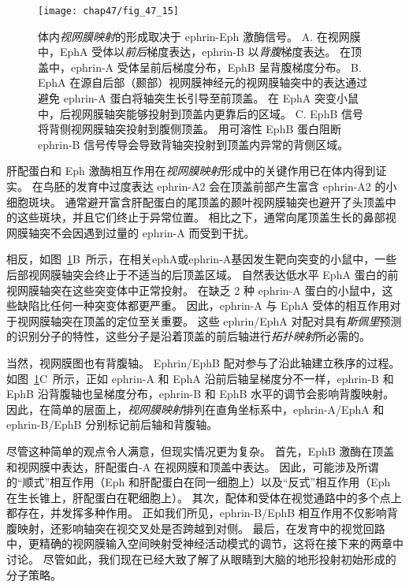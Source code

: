 \begin{figure}[htbp]
	\centering
	\texttt{[image: chap47/fig\_47\_15]}
	\caption{体内\textit{视网膜映射}的形成取决于 ephrin-Eph 激酶信号。
		A. 在视网膜中，EphA 受体以\textit{前后}梯度表达，ephrin-B 以\textit{背腹}梯度表达。
		在顶盖中，ephrin-A 受体呈前后梯度分布，EphB 呈背腹梯度分布。
		B. EphA 在源自后部（颞部）视网膜神经元的视网膜轴突中的表达通过避免 ephrin-A 蛋白将轴突生长引导至前顶盖。
		在 EphA 突变小鼠中，后视网膜轴突能够投射到顶盖内更靠后的区域。
		C. EphB 信号将背侧视网膜轴突投射到腹侧顶盖。
		用可溶性 EphB 蛋白阻断 ephrin-B 信号传导会导致背轴突投射到顶盖内异常的背侧区域。}
	\label{fig:47_15}
\end{figure}


肝配蛋白和 Eph 激酶相互作用在\textit{视网膜映射}形成中的关键作用已在体内得到证实。
在鸟胚的发育中过度表达 ephrin-A2 会在顶盖前部产生富含 ephrin-A2 的小细胞斑块。
通常避开富含肝配蛋白的尾顶盖的颞叶视网膜轴突也避开了头顶盖中的这些斑块，并且它们终止于异常位置。
相比之下，通常向尾顶盖生长的鼻部视网膜轴突不会因遇到过量的 ephrin-A 而受到干扰。


相反，如图~\ref{fig:47_15}B~所示，在相关ephA或ephrin-A基因发生靶向突变的小鼠中，一些后部视网膜轴突会终止于不适当的后顶盖区域。
自然表达低水平 EphA 蛋白的前视网膜轴突在这些突变体中正常投射。
在缺乏 2 种 ephrin-A 蛋白的小鼠中，这些缺陷比任何一种突变体都更严重。
因此，ephrin-A 与 EphA 受体的相互作用对于视网膜轴突在顶盖的定位至关重要。
这些 ephrin/EphA 对配对具有\textit{斯佩里}预测的识别分子的特性，这些分子是沿着顶盖的前后轴进行\textit{拓扑映射}所必需的。


当然，视网膜图也有背腹轴。
Ephrin/EphB 配对参与了沿此轴建立秩序的过程。
如图~\ref{fig:47_15}C~所示，正如 ephrin-A 和 EphA 沿前后轴呈梯度分不一样，ephrin-B 和 EphB 沿背腹轴也呈梯度分布，ephrin-B 和 EphB 水平的调节会影响背腹映射。
因此，在简单的层面上，\textit{视网膜映射}排列在直角坐标系中，ephrin-A/EphA 和 ephrin-B/EphB 分别标记前后轴和背腹轴。


尽管这种简单的观点令人满意，但现实情况更为复杂。
首先，EphB 激酶在顶盖和视网膜中表达，肝配蛋白-A 在视网膜和顶盖中表达。
因此，可能涉及所谓的“顺式”相互作用（Eph 和肝配蛋白在同一细胞上）以及“反式”相互作用（Eph 在生长锥上，肝配蛋白在靶细胞上）。
其次，配体和受体在视觉通路中的多个点上都存在，并发挥多种作用。
正如我们所见，ephrin-B/EphB 相互作用不仅影响背腹映射，还影响轴突在视交叉处是否跨越到对侧。
最后，在发育中的视觉回路中，更精确的视网膜输入空间映射受神经活动模式的调节，这将在接下来的两章中讨论。
尽管如此，我们现在已经大致了解了从眼睛到大脑的地形投射初始形成的分子策略。



